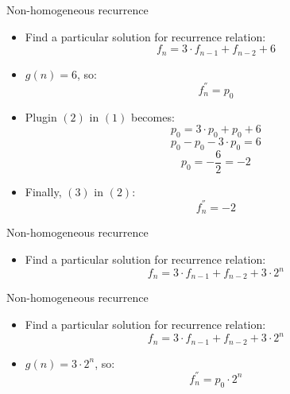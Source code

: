 \documentclass{beamer}
\begin{document}
\begin{frame}{Non-homogeneous recurrence}
    \begin{itemize}
        \item Find a particular solution for recurrence relation:
            \begin{equation}\tag{1}
                f_n = 3 \cdot f_{n-1} + f_{n-2} + 6
            \end{equation}
        \item $g(n) = 6$, so:
            \begin{equation}\tag{2}
                f_n^{''} = p_0
            \end{equation}
        \item Plugin $(2)$ in $(1)$ becomes: 
            $$ p_0 = 3 \cdot p_0 + p_0 + 6 $$
            $$ p_0 - p_0 - 3 \cdot p_0 = 6 $$
            \begin{equation}\tag{3}
                p_0 = - \frac{6}{2} =  -2
            \end{equation}
        \item Finally, $(3)$ in $(2)$:
        $$ f_n^{''} = -2 $$
    \end{itemize}
\end{frame}

\begin{frame}{Non-homogeneous recurrence}
   \begin{itemize}
        \item Find a particular solution for recurrence relation:
            \begin{equation}\tag{1}
                f_n = 3 \cdot f_{n-1} + f_{n-2} + 3 \cdot 2^n
            \end{equation}
      \end{itemize}
\end{frame}

\begin{frame}{Non-homogeneous recurrence}
   \begin{itemize}
        \item Find a particular solution for recurrence relation:
            \begin{equation}\tag{1}
                f_n = 3 \cdot f_{n-1} + f_{n-2} + 3 \cdot 2^n
            \end{equation}
        \item $g(n) = 3 \cdot 2^n$, so:
            \begin{equation}\tag{2}
                f_n^{''} = p_0 \cdot 2^n
            \end{equation}
      \end{itemize}
\end{frame}
\end{document}
